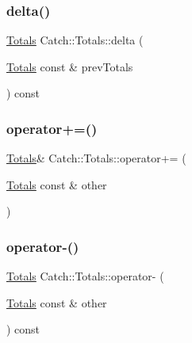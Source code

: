 \subsubsection{\texorpdfstring{delta()}{delta()}}
{\footnotesize\ttfamily \mbox{\hyperlink{struct_catch_1_1_totals}{Totals}} Catch\+::\+Totals\+::delta (\begin{DoxyParamCaption}\item[{\mbox{\hyperlink{struct_catch_1_1_totals}{Totals}} const \&}]{prev\+Totals }\end{DoxyParamCaption}) const\hspace{0.3cm}{\ttfamily [inline]}}

\mbox{\label{struct_catch_1_1_totals_a574015076e54cc405c70b053e3356e43}} 
\subsubsection{\texorpdfstring{operator+=()}{operator+=()}}
{\footnotesize\ttfamily \mbox{\hyperlink{struct_catch_1_1_totals}{Totals}}\& Catch\+::\+Totals\+::operator+= (\begin{DoxyParamCaption}\item[{\mbox{\hyperlink{struct_catch_1_1_totals}{Totals}} const \&}]{other }\end{DoxyParamCaption})\hspace{0.3cm}{\ttfamily [inline]}}

\mbox{\label{struct_catch_1_1_totals_a9279ed39139cb7e7b291918a6d08290e}} 
\subsubsection{\texorpdfstring{operator-\/()}{operator-()}}
{\footnotesize\ttfamily \mbox{\hyperlink{struct_catch_1_1_totals}{Totals}} Catch\+::\+Totals\+::operator-\/ (\begin{DoxyParamCaption}\item[{\mbox{\hyperlink{struct_catch_1_1_totals}{Totals}} const \&}]{other }\end{DoxyParamCaption}) const\hspace{0.3cm}{\ttfamily [inline]}}




